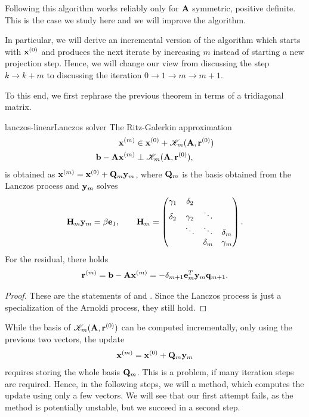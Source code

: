 \begin{remark}
  Following  this algorithm
  works reliably only for $\mathbf A$ symmetric, positive definite. This
  is the case we study here and we will improve the algorithm.

  In particular, we will derive an incremental version of the
  algorithm which starts with $\mathbf x^{(0)}$ and produces the next
  iterate by increasing $m$ instead of starting a new projection
  step. Hence, we will change our view from discussing the step
  $k\to k+m$ to discussing the iteration $0\to 1\to m\to m+1$.

  To this end, we first rephrase the previous theorem in terms of a
  tridiagonal matrix.
\end{remark}

\begin{Lemma*}{lanczos-linear}{Lanczos solver}
  The Ritz-Galerkin approximation
  \begin{align}
    \mathbf x^{(m)} &\in \mathbf x^{(0)} + \mathscr K_m(\mathbf A,\mathbf r^{(0)})\\
    \mathbf b-\mathbf A \mathbf x^{(m)} &\perp \mathscr K_m(\mathbf A,\mathbf r^{(0)}),
  \end{align}
  is obtained as $\mathbf x^{(m)} = \mathbf x^{(0)} + \mathbf Q_m \mathbf y_m$, where $\mathbf Q_m$ is the basis obtained from the Lanczos process and $\mathbf y_m$ solves
  \begin{gather}
    \mathbf H_m\mathbf y_m = \beta\mathbf e_1,
    \qquad \mathbf H_m =
    \begin{pmatrix}
      \gamma_1 & \delta_2\\
      \delta_2 & \gamma_2 & \ddots\\
      &\ddots&\ddots&\delta_m\\
      &&\delta_{m}&\gamma_m
    \end{pmatrix}.
  \end{gather}
  For the residual, there holds
  \begin{gather}
    \mathbf r^{(m)} = \mathbf b-\mathbf A\mathbf x^{(m)} = -\delta_{m+1} \mathbf e_m^T \mathbf y_m \mathbf q_{m+1}.
  \end{gather}
\end{Lemma*}

\begin{proof}
  These are the statements of
   and
  . Since the Lanczos
  process is just a specialization of the Arnoldi process, they still
  hold.
\end{proof}

\begin{intro}
  While the basis of $\mathscr K_m(\mathbf A,\mathbf r^{(0)})$ can be computed
  incrementally, only using the previous two vectors, the update
  \begin{gather}
    \mathbf x^{(m)} = \mathbf x^{(0)} + \mathbf Q_m \mathbf y_m
  \end{gather}
  requires storing the whole basis $\mathbf Q_m$. This is a problem, if
  many iteration steps are required. Hence, in the following steps, we
  will a method, which computes the update using only a few
  vectors. We will see that our first attempt fails, as the method is
  potentially unstable, but we succeed in a second step.
\end{intro}

